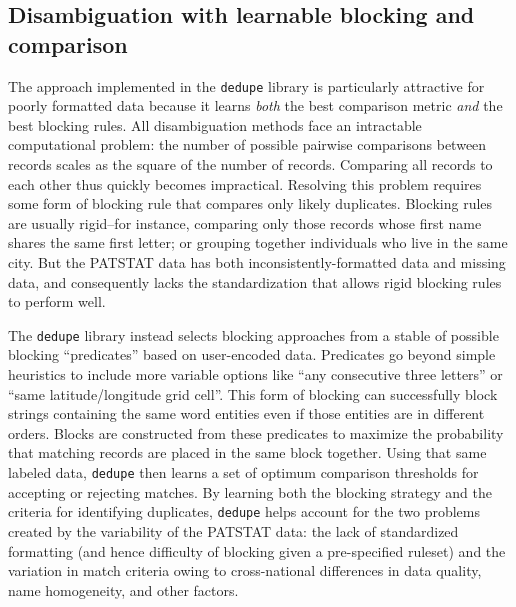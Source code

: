 \documentclass[11pt]{article}
\begin{document}

\subsection{Disambiguation with learnable blocking and comparison}
\label{sec:disamb-with-learn}

The \cite{bilenko2006learnable} approach implemented in the
\texttt{dedupe} library is particularly attractive
for poorly formatted data because it learns \textit{both} the best comparison
metric \textit{and} the best blocking rules. All disambiguation
methods face an intractable computational problem: the number of
possible pairwise comparisons between records scales
as the square of the number of records. Comparing all records to each
other thus quickly becomes impractical. Resolving this problem
requires some form of blocking rule that compares only likely
duplicates. Blocking rules are usually rigid--for instance, comparing
only those records whose first name shares the same first letter; or
grouping together individuals who live in the same city. But the
PATSTAT data has both inconsistently-formatted data and missing data,
and consequently lacks the standardization that allows rigid blocking
rules to perform well. 

The \texttt{dedupe} library instead selects blocking approaches from a
stable of possible blocking ``predicates'' based on user-encoded
data. Predicates go beyond simple
heuristics to include more variable options like ``any consecutive
three letters'' or ``same latitude/longitude grid cell''. This form of
blocking can successfully block strings containing the same word
entities even if those entities are in different orders. Blocks are
constructed from these predicates to maximize the probability that
matching records are placed in the same block together. Using that
same labeled data, \texttt{dedupe} then learns a set of optimum
comparison thresholds for accepting or rejecting matches. By learning
both the blocking strategy and the criteria for identifying
duplicates, \texttt{dedupe} helps account for the two problems created
by the variability of the PATSTAT data: the lack of standardized
formatting (and hence difficulty of blocking given a pre-specified
ruleset) and the variation in match criteria owing to cross-national
differences in data quality, name homogeneity, and other factors.
\end{document}
